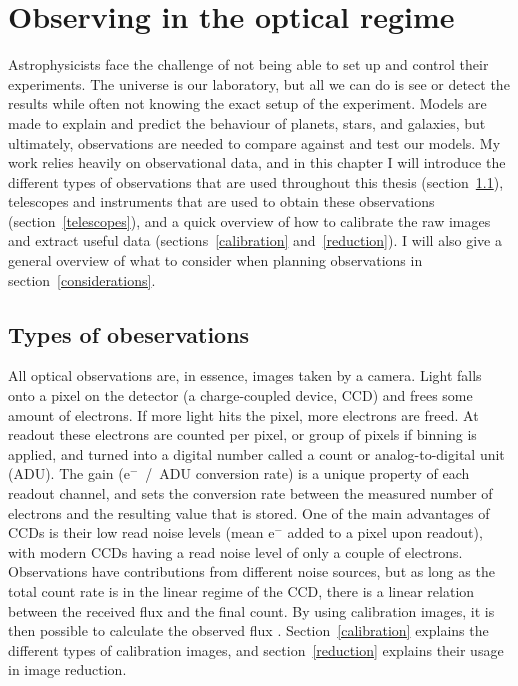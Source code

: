 \documentclass[a4paper,oneside,12pt, class=Latex/Classes/PhDthesisPSnPDF, crop=false]{standalone}
\begin{document}
\doublespacing
\chapter{Observing in the optical regime}
\label{chap:obs}


Astrophysicists face the challenge of not being able to set up and control their experiments. The universe is our laboratory, but all we can do is see or detect the results while often not knowing the exact setup of the experiment. Models are made to explain and predict the behaviour of planets, stars, and galaxies, but ultimately, observations are needed to compare against and test our models. My work relies heavily on observational data, and in this chapter I will introduce the different types of observations that are used throughout this thesis (section~\ref{observation_types}), telescopes and instruments that are used to obtain these observations (section~\ref{telescopes}), and a quick overview of how to calibrate the raw images and extract useful data (sections~\ref{calibration} and~\ref{reduction}). I will also give a general overview of what to consider when planning observations in section~\ref{considerations}.


\section{Types of obeservations}
\label{observation_types}
All optical observations are, in essence, images taken by a camera. Light falls onto a pixel on the detector (a charge-coupled device, CCD) and frees some amount of electrons. If more light hits the pixel, more electrons are freed. At readout these electrons are counted per pixel, or group of pixels if binning is applied, and turned into a digital number called a count or analog-to-digital unit (ADU). The gain (e$^-$~/~ADU conversion rate) is a unique property of each readout channel, and sets the conversion rate between the measured number of electrons and the resulting value that is stored. One of the main advantages of CCDs is their low read noise levels (mean e$^-$ added to a pixel upon readout), with modern CCDs having a read noise level of only a couple of electrons. Observations have contributions from different noise sources, but as long as the total count rate is in the linear regime of the CCD, there is a linear relation between the received flux and the final count. By using calibration images, it is then possible to calculate the observed flux \citep{CCD_handbook}. Section~\ref{calibration} explains the different types of calibration images, and section~\ref{reduction} explains their usage in image reduction.
\end{document}
